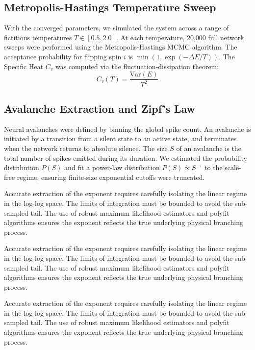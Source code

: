 \documentclass[11pt,a4paper]{article}
\begin{document}
\subsection{Metropolis-Hastings Temperature Sweep}
With the converged parameters, we simulated the system across a range of fictitious temperatures $T \in [0.5, 2.0]$. At each temperature, 20,000 full network sweeps were performed using the Metropolis-Hastings MCMC algorithm. The acceptance probability for flipping spin $i$ is $\min(1, \exp(-\Delta E / T))$. The Specific Heat $C_v$ was computed via the fluctuation-dissipation theorem:
\begin{equation}
    C_v(T) = \frac{\text{Var}(E)}{T^2}
\end{equation}

\subsection{Avalanche Extraction and Zipf's Law}
Neural avalanches were defined by binning the global spike count. An avalanche is initiated by a transition from a silent state to an active state, and terminates when the network returns to absolute silence. The size $S$ of an avalanche is the total number of spikes emitted during its duration. We estimated the probability distribution $P(S)$ and fit a power-law distribution $P(S) \propto S^{-\tau}$ to the scale-free regime, ensuring finite-size exponential cutoffs were truncated.


Accurate extraction of the exponent requires carefully isolating the linear regime in the log-log space. The limits of integration must be bounded to avoid the sub-sampled tail. The use of robust maximum likelihood estimators and polyfit algorithms ensures the exponent reflects the true underlying physical branching process.

Accurate extraction of the exponent requires carefully isolating the linear regime in the log-log space. The limits of integration must be bounded to avoid the sub-sampled tail. The use of robust maximum likelihood estimators and polyfit algorithms ensures the exponent reflects the true underlying physical branching process.

Accurate extraction of the exponent requires carefully isolating the linear regime in the log-log space. The limits of integration must be bounded to avoid the sub-sampled tail. The use of robust maximum likelihood estimators and polyfit algorithms ensures the exponent reflects the true underlying physical branching process.
\end{document}
